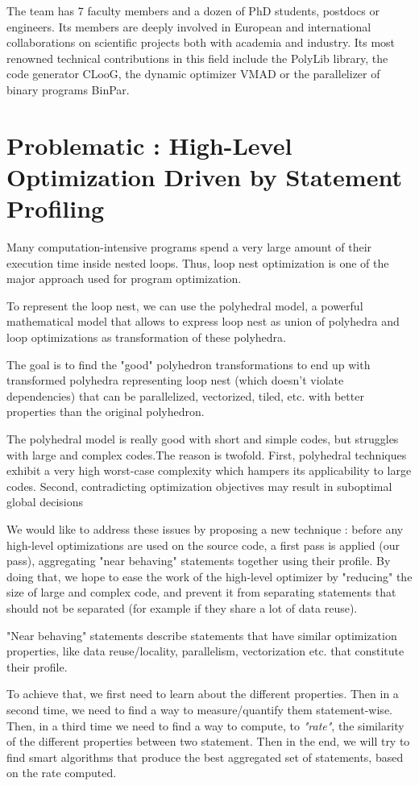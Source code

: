 \documentclass[paper=a4, fontsize=11.5pt]{scrartcl}
\numberwithin{equation}{section}        %
\numberwithin{figure}{section}          %
\numberwithin{table}{section}               %
\begin{document}
The team has 7 faculty members and a dozen of PhD students,
postdocs or engineers. Its members are deeply involved in European and international
collaborations on scientific projects both with academia and industry.
Its most renowned technical contributions in this field include
the PolyLib library, the code generator CLooG, the dynamic optimizer VMAD or the parallelizer
of binary programs BinPar.


\section{Problematic : High-Level Optimization Driven by Statement Profiling}
Many computation-intensive programs spend a very large amount of their execution
time inside nested loops. Thus, loop nest optimization is one of the major approach used
for program optimization.

To represent the loop nest, we can use the polyhedral model, a powerful mathematical model
that allows to express loop nest as union of polyhedra and loop optimizations as
transformation of these polyhedra.

The goal is to find the "good" polyhedron transformations to end up with
transformed polyhedra representing loop nest (which doesn't violate dependencies) 
that can be parallelized, vectorized, tiled, etc. with better properties than the original
polyhedron.

The polyhedral model is really good with short and simple codes, but struggles with
large and complex codes.The reason is twofold. First, polyhedral techniques exhibit
a very high worst-case complexity which hampers its applicability to large codes.
Second, contradicting optimization objectives may result in suboptimal global
decisions


We would like to address these issues by proposing a new technique : before any
high-level optimizations are used on the source code, a first pass is applied (our pass),
aggregating "near behaving" statements together using their profile.
By doing that, we hope to ease the work of the high-level optimizer by "reducing" the size
of large and complex code, and prevent it from separating statements that should
not be separated (for example if they share a lot of data reuse).

"Near behaving" statements describe statements that have similar optimization properties,
like data reuse/locality, parallelism, vectorization etc. that constitute their profile.

To achieve that, we first need to learn about the different properties. Then in a second
time, we need to find a way to measure/quantify them statement-wise. Then, in a third
time we need to find a way to compute, to \textit{"rate"}, the similarity of the different
properties between two statement. Then in the end, we will try to find smart algorithms
that produce the best aggregated set of statements, based on the rate computed.
\end{document}
